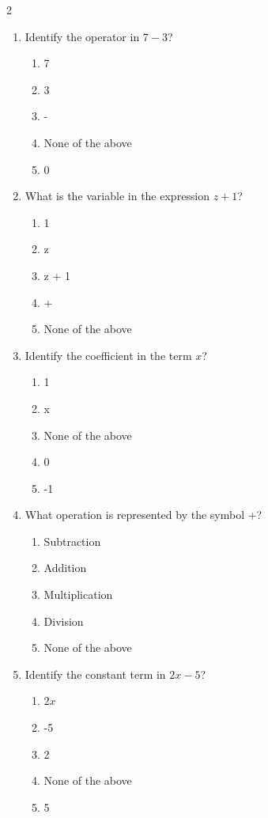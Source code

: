 \documentclass[10pt]{article}
\begin{document}
\begin{multicols}{2}
\begin{enumerate}[label=\textbf{Q\arabic*.}, leftmargin=*, itemsep=6pt, parsep=0pt]
  \item \small Identify the operator in $7 - 3$?
  \begin{enumerate}[label=(\Alph*), leftmargin=0.6cm, nosep, itemsep=2pt]
    \item 7
    \item 3
    \item -
    \item None of the above
    \item 0
  \end{enumerate}

  \item \small What is the variable in the expression $z + 1$?
  \begin{enumerate}[label=(\Alph*), leftmargin=0.6cm, nosep, itemsep=2pt]
    \item 1
    \item z
    \item z + 1
    \item +
    \item None of the above
  \end{enumerate}

  \item \small Identify the coefficient in the term $x$?
  \begin{enumerate}[label=(\Alph*), leftmargin=0.6cm, nosep, itemsep=2pt]
    \item 1
    \item x
    \item None of the above
    \item 0
    \item -1
  \end{enumerate}

  \item \small What operation is represented by the symbol $+$?
  \begin{enumerate}[label=(\Alph*), leftmargin=0.6cm, nosep, itemsep=2pt]
    \item Subtraction
    \item Addition
    \item Multiplication
    \item Division
    \item None of the above
  \end{enumerate}

  \item \small Identify the constant term in $2x - 5$?
  \begin{enumerate}[label=(\Alph*), leftmargin=0.6cm, nosep, itemsep=2pt]
    \item $2x$
    \item -5
    \item 2
    \item None of the above
    \item 5
  \end{enumerate}

\end{enumerate}
\end{multicols}
\end{document}
